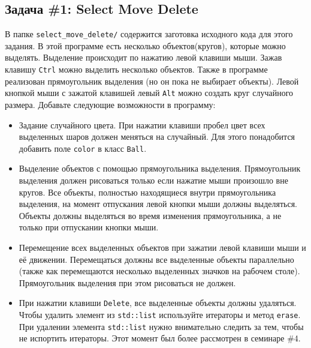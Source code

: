 \documentclass{article}
\begin{document}
\subsection*{Задача \#1: Select Move Delete}
 В папке \texttt{select\_move\_delete/} содержится заготовка исходного кода для этого задания. В этой программе есть несколько объектов(кругов), которые можно выделять. Выделение происходит по нажатию левой клавиши мыши. Зажав клавишу \texttt{Ctrl} можно выделить несколько объектов. Также в программе реализован прямоугольник выделения (но он пока не выбирает объекты). Левой кнопкой мыши с зажатой клавишей левый \texttt{Alt} можно создать круг случайного размера. Добавьте следующие возможности в программу:
\begin{itemize}
\item Задание случайного цвета. При нажатии клавиши пробел цвет всех выделенных шаров должен меняться на случайный. Для этого понадобится добавить поле \texttt{color} в класс \texttt{Ball}.

\item Выделение объектов с помощью прямоугольника выделения. Прямоугольник выделения должен рисоваться только если нажатие мыши произошло вне кругов. Все объекты, полностью находящиеся внутри прямоугольника выделения, на момент отпускания левой кнопки мыши должны выделяться. Объекты должны выделяться во время изменения прямоугольника, а не только при отпускании кнопки мыши.

\item Перемещение всех выделенных объектов при зажатии левой клавиши мыши и её движении. Перемещаться должны все выделенные объекты параллельно (также как перемещаются несколько выделенных значков на рабочем столе). Прямоугольник выделения при этом рисоваться не должен.

\item При нажатии клавиши \texttt{Delete}, все выделенные объекты должны удаляться. Чтобы удалить элемент из \texttt{std::list} используйте итераторы и метод \texttt{erase}. При удалении элемента \texttt{std::list} нужно внимательно следить за тем, чтобы не испортить итераторы. Этот момент был более рассмотрен в семинаре \#4.


\end{itemize}
\end{document}
